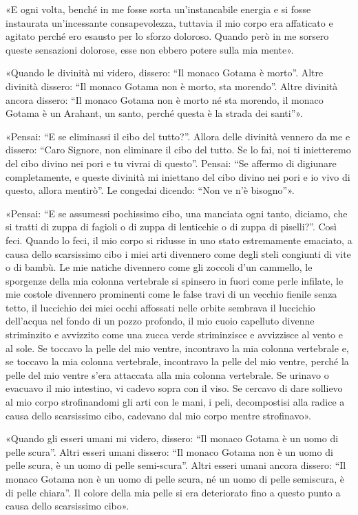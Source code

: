 «E ogni volta, benché in me fosse sorta un’instancabile energia e si
fosse instaurata un’incessante consapevolezza, tuttavia il mio corpo era
affaticato e agitato perché ero esausto per lo sforzo doloroso. Quando
però in me sorsero queste sensazioni dolorose, esse non ebbero potere
sulla mia mente».


«Quando le divinità mi videro, dissero: “Il monaco Gotama è morto”.
Altre divinità dissero: “Il monaco Gotama non è morto, sta morendo”.
Altre divinità ancora dissero: “Il monaco Gotama non è morto né sta
morendo, il monaco Gotama è un Arahant, un santo, perché questa è la
strada dei santi”».


«Pensai: “E se eliminassi il cibo del tutto?”. Allora delle divinità
vennero da me e dissero: “Caro Signore, non eliminare il cibo del tutto.
Se lo fai, noi ti inietteremo del cibo divino nei pori e tu vivrai di
questo”. Pensai: “Se affermo di digiunare completamente, e queste
divinità mi iniettano del cibo divino nei pori e io vivo di questo,
allora mentirò”. Le congedai dicendo: “Non ve n’è bisogno”».


«Pensai: “E se assumessi pochissimo cibo, una manciata ogni tanto,
diciamo, che si tratti di zuppa di fagioli o di zuppa di lenticchie o di
zuppa di piselli?”. Così feci. Quando lo feci, il mio corpo si ridusse
in uno stato estremamente emaciato, a causa dello scarsissimo cibo i
miei arti divennero come degli steli congiunti di vite o di bambù. Le
mie natiche divennero come gli zoccoli d’un cammello, le sporgenze della
mia colonna vertebrale si spinsero in fuori come perle infilate, le mie
costole divennero prominenti come le false travi di un vecchio fienile
senza tetto, il luccichio dei miei occhi affossati nelle orbite sembrava
il luccichio dell’acqua nel fondo di un pozzo profondo, il mio cuoio
capelluto divenne striminzito e avvizzito come una zucca verde
striminzisce e avvizzisce al vento e al sole. Se toccavo la pelle del
mio ventre, incontravo la mia colonna vertebrale e, se toccavo la mia
colonna vertebrale, incontravo la pelle del mio ventre, perché la pelle
del mio ventre s’era attaccata alla mia colonna vertebrale. Se urinavo o
evacuavo il mio intestino, vi cadevo sopra con il viso. Se cercavo di
dare sollievo al mio corpo strofinandomi gli arti con le mani, i peli,
decompostisi alla radice a causa dello scarsissimo cibo, cadevano dal
mio corpo mentre strofinavo».


«Quando gli esseri umani mi videro, dissero: “Il monaco Gotama è un uomo
di pelle scura”. Altri esseri umani dissero: “Il monaco Gotama non è un
uomo di pelle scura, è un uomo di pelle semi-scura”. Altri esseri umani
ancora dissero: “Il monaco Gotama non è un uomo di pelle scura, né un
uomo di pelle semiscura, è di pelle chiara”. Il colore della mia pelle
si era deteriorato fino a questo punto a causa dello scarsissimo cibo».


